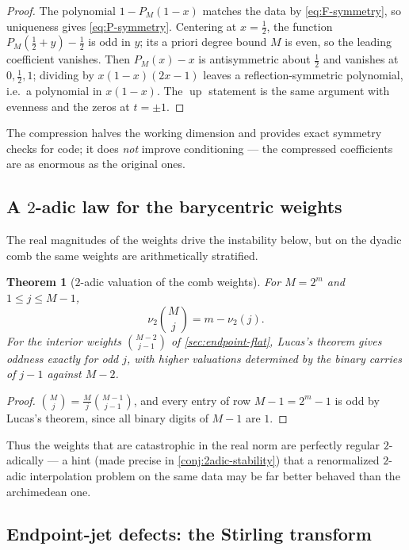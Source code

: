 \documentclass[11pt,oneside]{article}
\numberwithin{equation}{section}
\newtheorem{theorem}{Theorem}[section]
\theoremstyle{definition}
\theoremstyle{remark}
\newcommand{\Up}{\operatorname{up}}
\newcommand{\vtwo}{\nu_2}
\begin{document}
\begin{proof}
The polynomial $1-P_M(1-x)$ matches the data by
\eqref{eq:F-symmetry}, so uniqueness gives \eqref{eq:P-symmetry}.
Centering at $x=\tfrac12$, the function $P_M(\tfrac12+y)-\tfrac12$ is
odd in $y$; its a priori degree bound $M$ is even, so the leading
coefficient vanishes.  Then $P_M(x)-x$ is antisymmetric about
$\tfrac12$ and vanishes at $0,\tfrac12,1$; dividing by
$x(1-x)(2x-1)$ leaves a reflection-symmetric polynomial, i.e.\ a
polynomial in $x(1-x)$.  The $\Up$ statement is the same argument
with evenness and the zeros at $t=\pm1$.
\end{proof}

The compression halves the working dimension and provides exact
symmetry checks for code; it does \emph{not} improve conditioning ---
the compressed coefficients are as enormous as the original ones.

\subsection{A $2$-adic law for the barycentric weights}

The real magnitudes of the weights drive the instability below, but on
the dyadic comb the same weights are arithmetically stratified.

\begin{theorem}[$2$-adic valuation of the comb weights]
\label{thm:weight-valuation}
For $M=2^{m}$ and $1\le j\le M-1$,
\begin{equation}
 \vtwo\binom Mj=m-\vtwo(j).
 \label{eq:weight-valuation}
\end{equation}
For the interior weights $\binom{M-2}{j-1}$ of
\cref{sec:endpoint-flat}, Lucas's theorem gives oddness exactly for
odd $j$, with higher valuations determined by the binary carries of
$j-1$ against $M-2$.
\end{theorem}

\begin{proof}
$\binom Mj=\frac Mj\binom{M-1}{j-1}$, and every entry of row
$M-1=2^{m}-1$ is odd by Lucas's theorem, since all binary digits of
$M-1$ are $1$.
\end{proof}

Thus the weights that are catastrophic in the real norm are perfectly
regular $2$-adically --- a hint (made precise in
\cref{conj:2adic-stability}) that a renormalized $2$-adic
interpolation problem on the same data may be far better behaved than
the archimedean one.

\subsection{Endpoint-jet defects: the Stirling transform}
\end{document}
